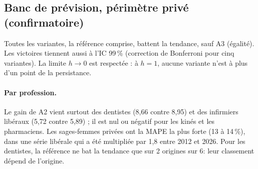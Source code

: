 \subsection{Banc de prévision, périmètre privé (confirmatoire)}
\begin{table}[h]
\centering\small
{}
\caption{MAPE par département à cinq ans, départements de 30 professionnels ou plus à l'origine,
moyenne à poids égal sur 22 cellules profession $\times$ origine. Toutes les valeurs sont
mesurées\mesure. IC par bootstrap des départements (2\,000 tirages, graine 20261114).}
\label{a2-tab:prive}
\end{table}

Toutes les variantes, la référence comprise, battent la tendance, sauf A3 (égalité). Les victoires
tiennent aussi à l'IC 99\,\% (correction de Bonferroni pour cinq variantes). La limite $h \to 0$ est
respectée : à $h = 1$, aucune variante n'est à plus d'un point de la persistance.

\paragraph{Par profession.} Le gain de A2 vient surtout des dentistes (8,66 contre 8,95\mesure) et des
infirmiers libéraux (5,72 contre 5,89\mesure) ; il est nul ou négatif pour les kinés et les pharmaciens.
Les sages-femmes privées ont la MAPE la plus forte (13 à 14\,\%\mesure), dans une série libérale qui a
été multipliée par 1,8\mesure{} entre 2012 et 2026. Pour les dentistes, la référence ne bat la tendance
que sur 2 origines sur 6\mesure : leur classement dépend de l'origine.


